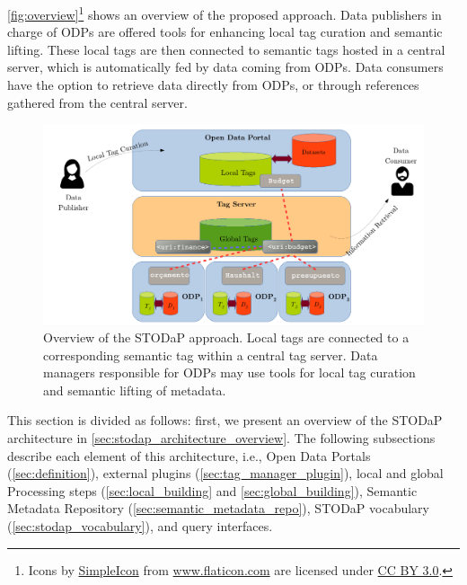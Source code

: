 \autoref{fig:overview}\footnote{Icons by \href{http://www.flaticon.com/authors/simpleicon}{SimpleIcon} from \href{http://www.flaticon.com}{www.flaticon.com} are licensed under \href{http://creativecommons.org/licenses/by/3.0/}{CC BY 3.0}.} shows an overview of the proposed approach.
Data publishers in charge of ODPs are offered tools for enhancing local tag curation and semantic lifting.
These local tags are then connected to semantic tags hosted in a central server, which is automatically fed by data coming from ODPs.
Data consumers have the option to retrieve data directly from ODPs, or through references gathered from the central server.

\begin{figure}[t]
\begin{center}
\includegraphics[width=\columnwidth]{images/overview.pdf}
\caption[Overview of the STODaP approach.]{Overview of the STODaP approach. Local tags are connected to a corresponding semantic tag within a central tag server. 
Data managers responsible for ODPs may use tools for local tag curation and semantic lifting of metadata.}
\label{fig:overview}
\end{center}
\end{figure}

This section is divided as follows: first, we present an overview of the STODaP architecture in \autoref{sec:stodap_architecture_overview}.
The following subsections describe each element of this architecture, i.e., Open Data Portals (\autoref{sec:definition}), external plugins (\autoref{sec:tag_manager_plugin}), local and global Processing steps (\autoref{sec:local_building} and \autoref{sec:global_building}), Semantic Metadata Repository (\autoref{sec:semantic_metadata_repo}),  STODaP vocabulary (\autoref{sec:stodap_vocabulary}), and query interfaces.


